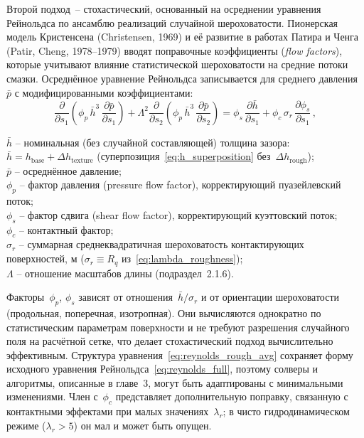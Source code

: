 Второй подход~-- стохастический, основанный на осреднении
уравнения Рейнольдса по ансамблю реализаций случайной
шероховатости. Пионерская модель Кристенсена (Christensen, 1969)
и её развитие в работах Патира и Ченга (Patir, Cheng, 1978--1979)
вводят поправочные коэффициенты (\textit{flow factors}), которые
учитывают влияние статистической шероховатости на средние потоки
смазки. Осреднённое уравнение Рейнольдса записывается для
среднего давления~$\bar{p}$ с модифицированными коэффициентами:
\begin{equation}
  \frac{\partial}{\partial s_1}\!\left(\phi_p\,\bar{h}^3\,
  \frac{\partial \bar{p}}{\partial s_1}\right)
  + \Lambda^2\frac{\partial}{\partial s_2}\!\left(\phi_p\,\bar{h}^3\,
  \frac{\partial \bar{p}}{\partial s_2}\right)
  = \phi_s\,\frac{\partial \bar{h}}{\partial s_1}
  + \phi_c\,\sigma_r\,\frac{\partial \phi_s}{\partial s_1}\,,
  \label{eq:reynolds_rough_avg}
\end{equation}
\begin{conditions}
$\bar{h}$ -- номинальная (без случайной составляющей) толщина зазора: $\bar{h} = h_{\mathrm{base}} + \Delta h_{\mathrm{texture}}$ (суперпозиция~\eqref{eq:h_superposition} без~$\Delta h_{\mathrm{rough}}$);\\
$\bar{p}$ -- осреднённое давление;\\
$\phi_p$ -- фактор давления (pressure flow factor),
корректирующий пуазейлевский поток;\\
$\phi_s$ -- фактор сдвига (shear flow factor),
корректирующий куэттовский поток;\\
$\phi_c$ -- контактный фактор;\\
$\sigma_r$ -- суммарная среднеквадратичная шероховатость
контактирующих поверхностей, м ($\sigma_r \equiv R_q$ из~\eqref{eq:lambda_roughness});\\
$\Lambda$ -- отношение масштабов длины
(подраздел~2.1.6).
\end{conditions}
Факторы~$\phi_p$, $\phi_s$ зависят от отношения~$\bar{h}/\sigma_r$
и от ориентации шероховатости (продольная, поперечная,
изотропная). Они вычисляются однократно по статистическим
параметрам поверхности и не требуют разрешения случайного поля
на расчётной сетке, что делает стохастический подход
вычислительно эффективным. Структура
уравнения~\eqref{eq:reynolds_rough_avg} сохраняет форму исходного
уравнения Рейнольдса~\eqref{eq:reynolds_full}, поэтому солверы
и алгоритмы, описанные в главе~3, могут быть адаптированы
с минимальными изменениями. Член с~$\phi_c$ представляет дополнительную поправку, связанную с контактными эффектами при малых значениях~$\lambda_r$; в чисто гидродинамическом режиме ($\lambda_r > 5$) он мал и может быть опущен.

